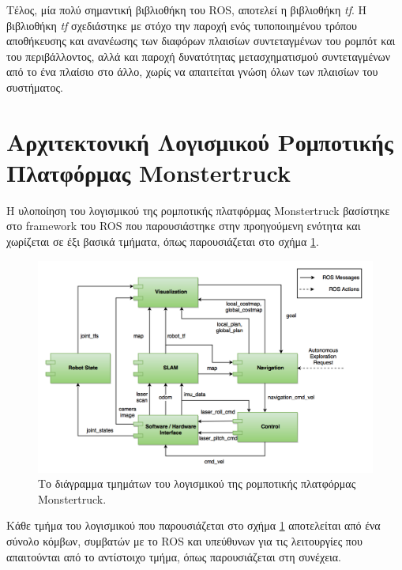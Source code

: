 \bigskip
Τέλος, μία πολύ σημαντική βιβλιοθήκη του ROS, αποτελεί η βιβλιοθήκη \textit{tf}. Η βιβλιοθήκη \textit{tf} σχεδιάστηκε με στόχο την παροχή ενός τυποποιημένου τρόπου αποθήκευσης και ανανέωσης των διαφόρων πλαισίων συντεταγμένων του ρομπότ και του περιβάλλοντος, αλλά και παροχή δυνατότητας μετασχηματισμού συντεταγμένων από το ένα πλαίσιο στο άλλο, χωρίς να απαιτείται γνώση όλων των πλαισίων του συστήματος.


\section{Αρχιτεκτονική Λογισμικού Ρομποτικής Πλατφόρμας Monstertruck} \label{sec:software}
Η υλοποίηση του λογισμικού της ρομποτικής πλατφόρμας Monstertruck βασίστηκε στο framework του ROS που παρουσιάστηκε στην προηγούμενη ενότητα και χωρίζεται σε έξι βασικά τμήματα, όπως παρουσιάζεται στο σχήμα \ref{fig:component_diagram}.

\begin{figure}[!ht]
	\centering
	\includegraphics[width=\linewidth]{Chapters/Chapter4/Figures/component_diagram.png}
	\caption{Το διάγραμμα τμημάτων του λογισμικού της ρομποτικής πλατφόρμας Monstertruck.}
	\label{fig:component_diagram}
\end{figure}

\bigskip
Κάθε τμήμα του λογισμικού που παρουσιάζεται στο σχήμα \ref{fig:component_diagram} αποτελείται από ένα σύνολο κόμβων, συμβατών με το ROS και υπεύθυνων για τις λειτουργίες που απαιτούνται από το αντίστοιχο τμήμα, όπως παρουσιάζεται στη συνέχεια.

